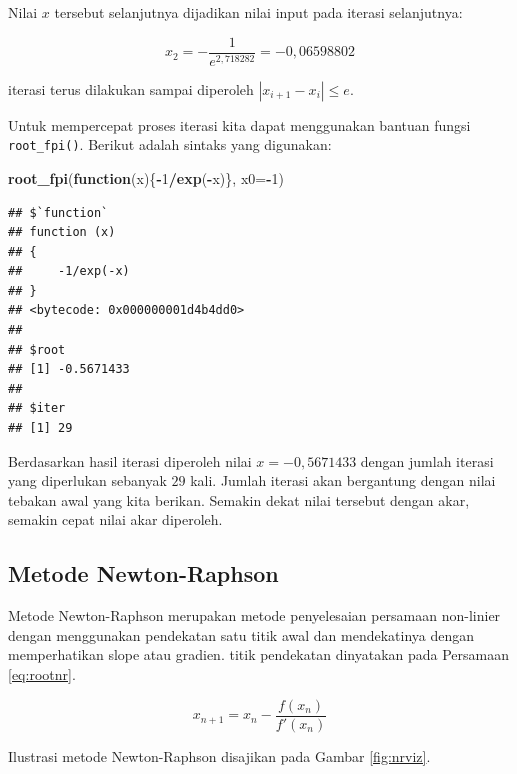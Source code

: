 \documentclass[]{book}
\newenvironment{Shaded}{\begin{snugshade}}{\end{snugshade}}
\newcommand{\ControlFlowTok}[1]{\textcolor[rgb]{0.13,0.29,0.53}{\textbf{#1}}}
\newcommand{\DataTypeTok}[1]{\textcolor[rgb]{0.13,0.29,0.53}{#1}}
\newcommand{\DecValTok}[1]{\textcolor[rgb]{0.00,0.00,0.81}{#1}}
\newcommand{\KeywordTok}[1]{\textcolor[rgb]{0.13,0.29,0.53}{\textbf{#1}}}
\newcommand{\NormalTok}[1]{#1}
\newcommand{\OperatorTok}[1]{\textcolor[rgb]{0.81,0.36,0.00}{\textbf{#1}}}
\theoremstyle{definition}
\theoremstyle{definition}
\theoremstyle{definition}
\theoremstyle{remark}
\begin{document}
Nilai \(x\) tersebut selanjutnya dijadikan nilai input pada iterasi selanjutnya:

\[
x_2 = -\frac{1}{e^{2,718282}}=-0,06598802
\]

iterasi terus dilakukan sampai diperoleh \(\left| x_{i+1}-x_i \right|\le e\).

Untuk mempercepat proses iterasi kita dapat menggunakan bantuan fungsi \texttt{root\_fpi()}. Berikut adalah sintaks yang digunakan:

\begin{Shaded}
\begin{Highlighting}[]
\KeywordTok{root_fpi}\NormalTok{(}\ControlFlowTok{function}\NormalTok{(x)\{}\OperatorTok{-}\DecValTok{1}\OperatorTok{/}\KeywordTok{exp}\NormalTok{(}\OperatorTok{-}\NormalTok{x)\}, }\DataTypeTok{x0=}\OperatorTok{-}\DecValTok{1}\NormalTok{)}
\end{Highlighting}
\end{Shaded}

\begin{verbatim}
## $`function`
## function (x) 
## {
##     -1/exp(-x)
## }
## <bytecode: 0x000000001d4b4dd0>
## 
## $root
## [1] -0.5671433
## 
## $iter
## [1] 29
\end{verbatim}

Berdasarkan hasil iterasi diperoleh nilai \(x=-0,5671433\) dengan jumlah iterasi yang diperlukan sebanyak \(29\) kali. Jumlah iterasi akan bergantung dengan nilai tebakan awal yang kita berikan. Semakin dekat nilai tersebut dengan akar, semakin cepat nilai akar diperoleh.

\hypertarget{newtonraphson}{%
\subsection{Metode Newton-Raphson}\label{newtonraphson}}

Metode Newton-Raphson merupakan metode penyelesaian persamaan non-linier dengan menggunakan pendekatan satu titik awal dan mendekatinya dengan memperhatikan slope atau gradien. titik pendekatan dinyatakan pada Persamaan \eqref{eq:rootnr}.

\begin{equation}
x_{n+1}=x_n-\frac{f\left(x_n\right)}{f'\left(x_n\right)}
  \label{eq:rootnr}
\end{equation}

Ilustrasi metode Newton-Raphson disajikan pada Gambar \ref{fig:nrviz}.
\end{document}
